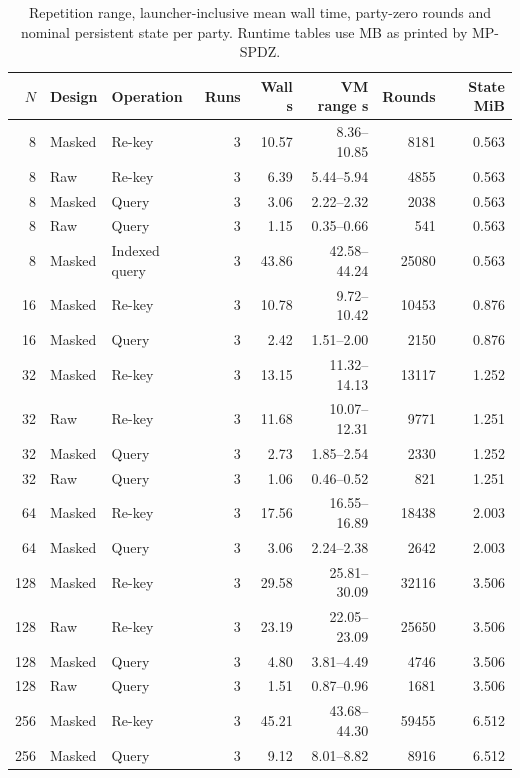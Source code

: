\begin{table}[H]
\caption{Repetition range, launcher-inclusive mean wall time, party-zero rounds and nominal persistent state per party. Runtime tables use MB as printed by MP-SPDZ.}
\label{tab:supp_perf}\centering\small
\setlength{\tabcolsep}{3pt}
\begin{tabular}{rllrrrrr}
\toprule
$N$ & Design & Operation & Runs & Wall s & VM range s & Rounds & State MiB \\
\midrule
8 & Masked & Re-key & 3 & 10.57 & 8.36--10.85 & 8181 & 0.563 \\
8 & Raw & Re-key & 3 & 6.39 & 5.44--5.94 & 4855 & 0.563 \\
8 & Masked & Query & 3 & 3.06 & 2.22--2.32 & 2038 & 0.563 \\
8 & Raw & Query & 3 & 1.15 & 0.35--0.66 & 541 & 0.563 \\
8 & Masked & Indexed query & 3 & 43.86 & 42.58--44.24 & 25080 & 0.563 \\
16 & Masked & Re-key & 3 & 10.78 & 9.72--10.42 & 10453 & 0.876 \\
16 & Masked & Query & 3 & 2.42 & 1.51--2.00 & 2150 & 0.876 \\
32 & Masked & Re-key & 3 & 13.15 & 11.32--14.13 & 13117 & 1.252 \\
32 & Raw & Re-key & 3 & 11.68 & 10.07--12.31 & 9771 & 1.251 \\
32 & Masked & Query & 3 & 2.73 & 1.85--2.54 & 2330 & 1.252 \\
32 & Raw & Query & 3 & 1.06 & 0.46--0.52 & 821 & 1.251 \\
64 & Masked & Re-key & 3 & 17.56 & 16.55--16.89 & 18438 & 2.003 \\
64 & Masked & Query & 3 & 3.06 & 2.24--2.38 & 2642 & 2.003 \\
128 & Masked & Re-key & 3 & 29.58 & 25.81--30.09 & 32116 & 3.506 \\
128 & Raw & Re-key & 3 & 23.19 & 22.05--23.09 & 25650 & 3.506 \\
128 & Masked & Query & 3 & 4.80 & 3.81--4.49 & 4746 & 3.506 \\
128 & Raw & Query & 3 & 1.51 & 0.87--0.96 & 1681 & 3.506 \\
256 & Masked & Re-key & 3 & 45.21 & 43.68--44.30 & 59455 & 6.512 \\
256 & Masked & Query & 3 & 9.12 & 8.01--8.82 & 8916 & 6.512 \\
\bottomrule
\end{tabular}
\end{table}

